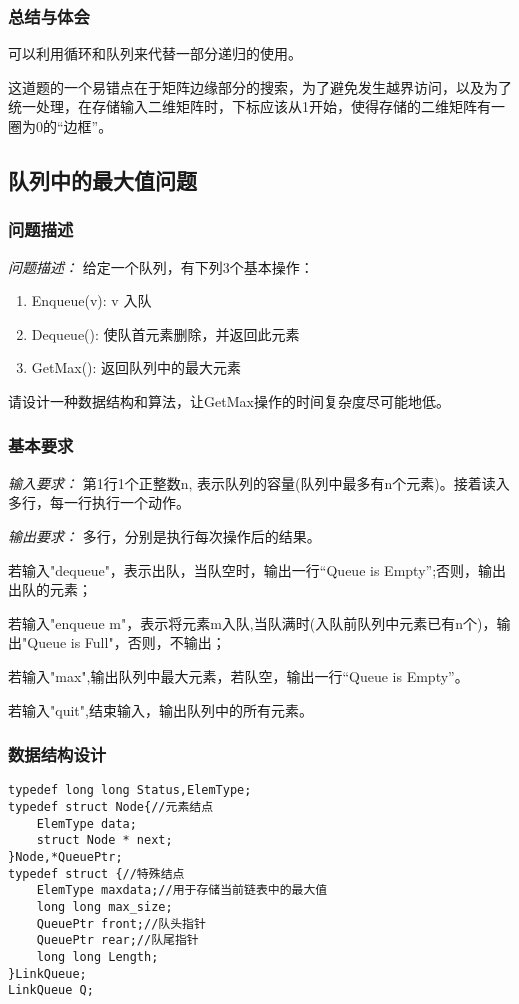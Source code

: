 \documentclass[a4paper,11pt]{article}%
\newenvironment{shadedquotation}
 {\begin{shaded*}
  \quoting[leftmargin=0pt, vskip=0pt]
 }
 {\endquoting
 \end{shaded*}
}
\begin{document}
\subsubsection{总结与体会}
可以利用循环和队列来代替一部分递归的使用。

这道题的一个易错点在于矩阵边缘部分的搜索，为了避免发生越界访问，以及为了
统一处理，在存储输入二维矩阵时，下标应该从1开始，使得存储的二维矩阵有一圈为0的“边框”。
\subsection{队列中的最大值问题}
\subsubsection{问题描述}
\begin{shadedquotation}
    \emph{问题描述：}
    给定一个队列，有下列3个基本操作：
    \begin{enumerate}
        \item Enqueue(v): v 入队
        \item Dequeue(): 使队首元素删除，并返回此元素
        \item GetMax(): 返回队列中的最大元素
    \end{enumerate}
请设计一种数据结构和算法，让GetMax操作的时间复杂度尽可能地低。
\end{shadedquotation}
\subsubsection{基本要求}
\begin{shadedquotation}
    \emph{输入要求：}
    第1行1个正整数n, 表示队列的容量(队列中最多有n个元素)。接着读入多行，每一行执行一个动作。
\end{shadedquotation}
\begin{shadedquotation}
    \emph{输出要求：}
    多行，分别是执行每次操作后的结果。

    若输入"dequeue"，表示出队，当队空时，输出一行“Queue is Empty”;否则，输出出队的元素；

    若输入"enqueue m"，表示将元素m入队,当队满时(入队前队列中元素已有n个)，输出"Queue is Full"，否则，不输出；

    若输入"max",输出队列中最大元素，若队空，输出一行“Queue is Empty”。

    若输入"quit",结束输入，输出队列中的所有元素。
\end{shadedquotation}
\subsubsection{数据结构设计}
\begin{lstlisting}[language={[ANSI]C},keywordstyle=\color{blue!70},commentstyle=\color{red!50!green!50!blue!50},frame=shadowbox,
				rulesepcolor=\color{red!20!green!20!blue!20}]
typedef long long Status,ElemType;
typedef struct Node{//元素结点
	ElemType data;
	struct Node * next;
}Node,*QueuePtr;
typedef struct {//特殊结点
	ElemType maxdata;//用于存储当前链表中的最大值
	long long max_size;
	QueuePtr front;//队头指针
	QueuePtr rear;//队尾指针
	long long Length;
}LinkQueue;
LinkQueue Q;
\end{lstlisting}
\end{document}
